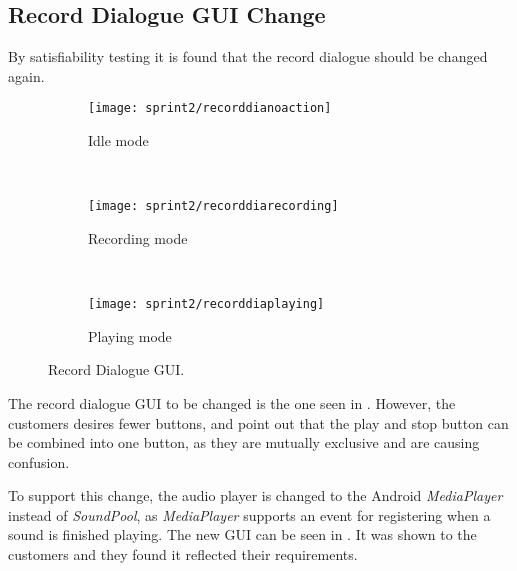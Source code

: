 \subsection{Record Dialogue GUI Change}
By satisfiability testing it is found that the record dialogue should be changed again.

\begin{figure}[h]
        \centering
        \begin{subfigure}[b]{0.3\textwidth}
                \texttt{[image: sprint2/recorddianoaction]}
                \caption{Idle mode}
                \label{fig:recordnoaction}
        \end{subfigure}%
        ~ %
        \begin{subfigure}[b]{0.3\textwidth}
                \texttt{[image: sprint2/recorddiarecording]}
                \caption{Recording mode}
                \label{fig:recordrecording}
        \end{subfigure}
        ~ %
        \begin{subfigure}[b]{0.3\textwidth}
                \texttt{[image: sprint2/recorddiaplaying]}
                \caption{Playing mode}
                \label{fig:recordplaying}
        \end{subfigure}
        \caption{Record Dialogue GUI.}\label{fig:recorddia}
\end{figure}

The record dialogue GUI to be changed is the one seen in .
However, the customers desires fewer buttons, and point out that the play and stop button can be combined into one button, as they are mutually exclusive and are causing confusion.

To support this change, the audio player is changed to the Android \textit{MediaPlayer} instead of \textit{SoundPool}, as \textit{MediaPlayer} supports an event for registering when a sound is finished playing.
The new GUI can be seen in .
It was shown to the customers and they found it reflected their requirements.